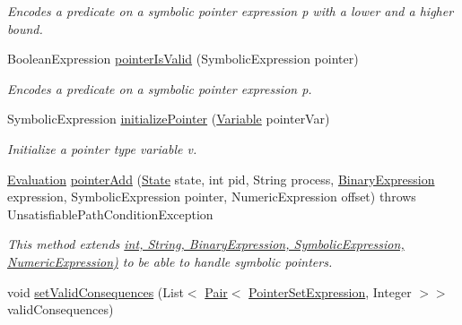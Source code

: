 \begin{DoxyCompactItemize}
\begin{DoxyCompactList}\small\item\em Encodes a  predicate on a symbolic pointer expression p with a lower and a higher bound. \end{DoxyCompactList}\item 
Boolean\+Expression \hyperlink{interfaceedu_1_1udel_1_1cis_1_1vsl_1_1civl_1_1semantics_1_1IF_1_1ContractConditionGenerator_ab3926afcdb239308cf3b45f691a494d6}{pointer\+Is\+Valid} (Symbolic\+Expression pointer)
\begin{DoxyCompactList}\small\item\em Encodes a  predicate on a symbolic pointer expression p. \end{DoxyCompactList}\item 
Symbolic\+Expression \hyperlink{interfaceedu_1_1udel_1_1cis_1_1vsl_1_1civl_1_1semantics_1_1IF_1_1ContractConditionGenerator_a37512f64b055368b06a46c1f9873671f}{initialize\+Pointer} (\hyperlink{interfaceedu_1_1udel_1_1cis_1_1vsl_1_1civl_1_1model_1_1IF_1_1variable_1_1Variable}{Variable} pointer\+Var)
\begin{DoxyCompactList}\small\item\em Initialize a pointer type variable v. \end{DoxyCompactList}\item 
\hyperlink{classedu_1_1udel_1_1cis_1_1vsl_1_1civl_1_1semantics_1_1IF_1_1Evaluation}{Evaluation} \hyperlink{interfaceedu_1_1udel_1_1cis_1_1vsl_1_1civl_1_1semantics_1_1IF_1_1ContractConditionGenerator_a4e21ef614c25a5d547a5e06ee307d7e6}{pointer\+Add} (\hyperlink{interfaceedu_1_1udel_1_1cis_1_1vsl_1_1civl_1_1state_1_1IF_1_1State}{State} state, int pid, String process, \hyperlink{interfaceedu_1_1udel_1_1cis_1_1vsl_1_1civl_1_1model_1_1IF_1_1expression_1_1BinaryExpression}{Binary\+Expression} expression, Symbolic\+Expression pointer, Numeric\+Expression offset)  throws Unsatisfiable\+Path\+Condition\+Exception
\begin{DoxyCompactList}\small\item\em This method extends \hyperlink{}{int, String, Binary\+Expression, Symbolic\+Expression, Numeric\+Expression)} to be able to handle symbolic pointers. \end{DoxyCompactList}\item 
void \hyperlink{interfaceedu_1_1udel_1_1cis_1_1vsl_1_1civl_1_1semantics_1_1IF_1_1ContractConditionGenerator_a1581e8d6617d0ea28164a995ee60c112}{set\+Valid\+Consequences} (List$<$ \hyperlink{classedu_1_1udel_1_1cis_1_1vsl_1_1civl_1_1util_1_1IF_1_1Pair}{Pair}$<$ \hyperlink{interfaceedu_1_1udel_1_1cis_1_1vsl_1_1civl_1_1model_1_1IF_1_1expression_1_1PointerSetExpression}{Pointer\+Set\+Expression}, Integer $>$$>$ valid\+Consequences)
$$
\end{DoxyCompactItemize}
